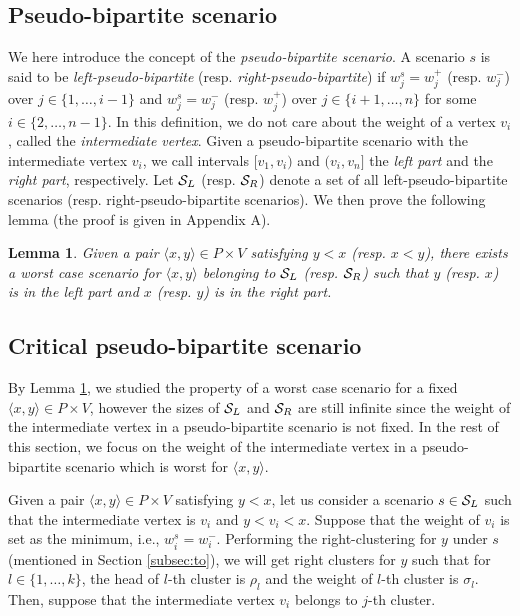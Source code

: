 \documentclass[a4paper]{llncs}
\newtheorem{lem}{Lemma}
\begin{document}
\subsection{Pseudo-bipartite scenario}
\label{subsec:pbs}
We here introduce the concept of the {\it pseudo-bipartite scenario}.
A scenario $s$ is said to be {\it left-pseudo-bipartite} (resp. {\it right-pseudo-bipartite})
if $w^s_j = w^+_j$ (resp. $w^-_j$) over $j \in \{1, \ldots, i-1\}$ and 
$w^s_j = w^-_j$ (resp. $w^+_j$) over $j \in \{i+1, \ldots, n\}$ for some $i \in \{2, \ldots, n-1\}$.
In this definition, we do not care about the weight of a vertex $v_i$, called the {\it intermediate vertex}.
Given a pseudo-bipartite scenario with the intermediate vertex $v_i$, we call intervals $[v_1, v_i)$ and $(v_i, v_n]$ the {\it left part} and the {\it right part}, respectively.
Let ${\cal S}_L$ (resp. ${\cal S}_R$) denote a set of all left-pseudo-bipartite scenarios (resp. right-pseudo-bipartite scenarios).
We then prove the following lemma (the proof is given in Appendix A).
\begin{lem}
Given a pair $\langle x, y \rangle \in P \times V$ satisfying $y < x$ (resp. $x < y$), there exists a worst case scenario for $\langle x, y \rangle$ belonging to ${\cal S}_L$ (resp. ${\cal S}_R$) such that $y$ (resp. $x$) is in the left part and $x$ (resp. $y$) is in the right part.
\label{lem:wcsxy}
\end{lem}












\subsection{Critical pseudo-bipartite scenario}
\label{subsec:cpbs}
By Lemma \ref{lem:wcsxy}, we studied the property of a worst case scenario for a fixed $\langle x, y \rangle \in P \times V$,
however 
the sizes of ${\cal S}_L$ and ${\cal S}_R$
are still infinite since the weight of the intermediate vertex in a pseudo-bipartite scenario is not fixed.
In the rest of this section, we focus on the weight of the intermediate vertex in a pseudo-bipartite scenario
which is worst for $\langle x, y \rangle$.

Given a pair $\langle x, y \rangle \in P \times V$ satisfying $y < x$,
let us consider a scenario $s \in {\cal S}_L$ 
such that the intermediate vertex is $v_i$ and $y<v_i<x$.
Suppose that the weight of $v_i$ is set as the minimum, i.e., $w^s_i=w^-_i$.
Performing the right-clustering for $y$ under $s$ (mentioned in Section \ref{subsec:to}), 
we will get right clusters for $y$ such that 
for $l \in \{1, \ldots, k\}$,
the head of $l$-th cluster is $\rho_l$
and the weight of $l$-th cluster is $\sigma_l$.
Then, suppose that the intermediate vertex $v_i$ belongs to $j$-th cluster.
\end{document}
